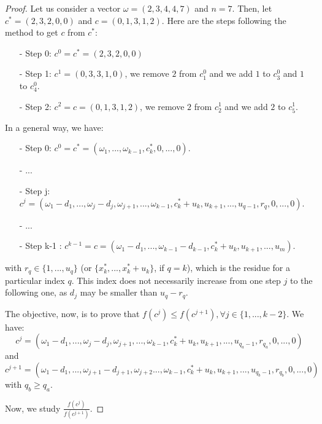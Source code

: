 \documentclass[jair,twoside,11pt,theapa]{article}
\begin{document}
\begin{proof}
Let us consider a vector $\omega=(2,3,4,4,7)$ and $n=7$. Then, let $c^* = (2,3,2,0,0)$ and $c=(0,1,3,1,2)$. Here are the steps following the method to get $c$ from $c^*$:
	\begin{itemize}
		\item[-] Step 0: $c^0=c^*=(2,3,2,0,0)$
		\item[-] Step 1: $c^1=(0,3,3,1,0)$, we remove $2$ from $c^0_1$ and we add $1$ to $c^0_3$ and $1$ to $c^0_4$.
		\item[-] Step 2: $c^2=c=(0,1,3,1,2)$, we remove $2$ from $c^1_2$ and we add $2$ to $c^1_5$.
	\end{itemize}

In a general way, we have:
\begin{itemize}
	\item[-] Step 0: $c^0=c^*=(\omega_1, ..., \omega_{k-1}, c^*_k,0,...,0)$.
	\item[-] ...
	\item[-] Step j: $c^j=(\omega_1-d_1,..., \omega_j -d_j, \omega_{j+1},..., \omega_{k-1}, c^*_k + u_k, u_{k+1}, ..., u_{q-1}, r_q, 0, ...,0)$.
	\item[-] ...
	\item[-] Step k-1 : $c^{k-1}=c=(\omega_1-d_1,..., \omega_{k-1}-d_{k-1}, c^*_k +u_k, u_{k+1},..., u_m)$.
\end{itemize}
with $r_q \in \lbrace 1,...,u_q \rbrace$ (or $\lbrace x^*_k,..., x^*_k + u_k\rbrace$, if $q=k$), which is the residue for a particular index $q$. This index does not necessarily increase from one step $j$ to the following one, as $d_j$ may be smaller than $u_q-r_q$.

The objective, now, is to prove that $f(c^j) \leq f(c^{j+1}), \forall j \in \lbrace 1,...,k-2\rbrace$. We have:
\begin{equation*}
	c^j=(\omega_1-d_1,..., \omega_j -d_j, \omega_{j+1},..., \omega_{k-1}, c^*_k + u_k, u_{k+1}, ..., u_{q_a-1}, r_{q_a}, 0, ...,0)
\end{equation*}
and
\begin{equation*}
	c^{j+1}=(\omega_1-d_1,..., \omega_{j+1}-d_{j+1}, \omega_{j+2}..., \omega_{k-1}, c^*_k + u_k, u_{k+1}, ..., u_{q_b-1}, r_{q_b}, 0, ...,0)
\end{equation*}
with $q_b \geq q_a$.

Now, we study $\frac{f(c^j)}{f(c^{j+1})}$.


\end{proof}
\end{document}
